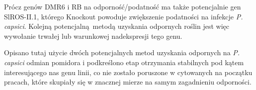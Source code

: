 \documentclass[two column, twoside, a4paper]{article}
\begin{document}
Prócz genów DMR6 i RB na odporność/podatność ma także potencjalnie gen SlROS-II.1, którego Knockout powoduje zwiększenie podatności na infekcje \textit{P. capsici}\autocite{Yang2020}. Kolejną potencjalną metodą uzyskania odpornych roślin jest więc wywołanie trwałej lub warunkowej nadekspresji tego genu.

Opisano tutaj użycie dwóch potencjalnych metod uzyskania odpornych na \textit{P. capsici} odmian pomidora i podkreślono etap otrzymania stabilnych pod kątem interesującego nas genu linii, co nie zostało poruszone w cytowanych na początku pracach, które skupiały się w znacznej mierze na samym zagadnieniu odporności.

\printbibliography
\end{document}
